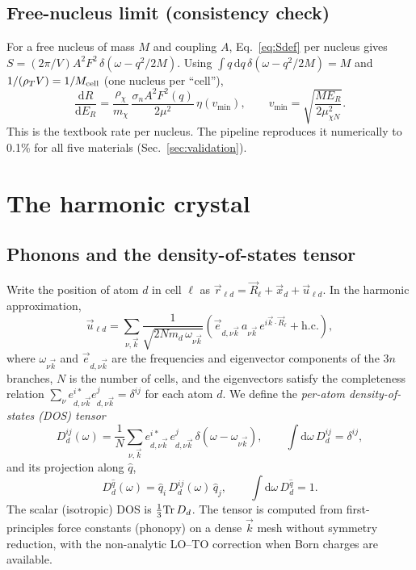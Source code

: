 \documentclass[11pt,a4paper]{article}
\numberwithin{equation}{section}
\newcommand{\qh}{\hat q}
\newcommand{\dd}{\mathrm{d}}
\newcommand{\mchi}{m_\chi}
\begin{document}
\subsection{Free-nucleus limit (consistency check)}
For a free nucleus of mass $M$ and coupling $A$, Eq.~\eqref{eq:Sdef} per nucleus gives
$S=(2\pi/V)A^2F^2\,\delta(\omega-q^2/2M)$. Using
$\int q\,\dd q\,\delta(\omega-q^2/2M)=M$ and $1/(\rho_T V)=1/M_{\rm cell}$ (one nucleus per
``cell''),
\begin{equation}
  \frac{\dd R}{\dd E_R} = \frac{\rho_\chi}{\mchi}\,
  \frac{\sigma_n A^2 F^2(q)}{2\mu^2}\,\eta(v_{\min}),
  \qquad v_{\min}=\sqrt{\frac{M E_R}{2\mu_{\chi N}^2}}.
\end{equation}
This is the textbook rate per nucleus. The pipeline reproduces it numerically to 0.1\% for all
five materials (Sec.~\ref{sec:validation}).

\section{The harmonic crystal}
\label{sec:harmonic}
\subsection{Phonons and the density-of-states tensor}
Write the position of atom $d$ in cell $\ell$ as
$\vec r_{\ell d}=\vec R_\ell+\vec x_d+\vec u_{\ell d}$. In the harmonic approximation,
\begin{equation}
  \vec u_{\ell d} = \sum_{\nu,\vec k}\frac{1}{\sqrt{2N m_d\,\omega_{\nu\vec k}}}
  \left(\vec e_{d,\nu\vec k}\,a_{\nu\vec k}\,e^{i\vec k\cdot\vec R_\ell} + \text{h.c.}\right),
\end{equation}
where $\omega_{\nu\vec k}$ and $\vec e_{d,\nu\vec k}$ are the frequencies and eigenvector
components of the $3n$ branches, $N$ is the number of cells, and the eigenvectors satisfy the
completeness relation $\sum_\nu e^{i*}_{d,\nu\vec k}e^{j}_{d,\nu\vec k}=\delta^{ij}$ for each
atom $d$. We define the \emph{per-atom density-of-states (DOS) tensor}
\begin{equation}
  D^{ij}_d(\omega) = \frac1N\sum_{\nu,\vec k} e^{i*}_{d,\nu\vec k}\,e^{j}_{d,\nu\vec k}\,
  \delta(\omega-\omega_{\nu\vec k}),
  \qquad \int\dd\omega\, D^{ij}_d = \delta^{ij},
\end{equation}
and its projection along $\qh$,
\begin{equation}
  D_d^{\qh}(\omega) = \qh_i\, D^{ij}_d(\omega)\,\qh_j,
  \qquad \int\dd\omega\, D_d^{\qh}=1 .
\end{equation}
The scalar (isotropic) DOS is $\frac13{\rm Tr}\,D_d$. The tensor is computed from
first-principles force constants (phonopy) on a dense $\vec k$ mesh without symmetry
reduction, with the non-analytic LO--TO correction when Born charges are available.
\end{document}

